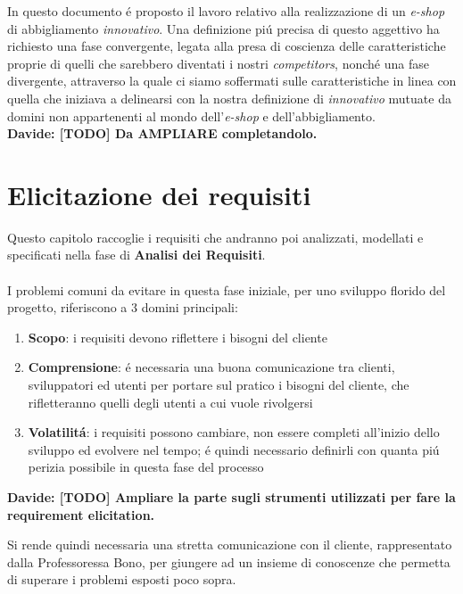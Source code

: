\documentclass[12pt]{article}
\newcommand{\davide}[1]{{\bf \color{chromeyellow} Davide: #1 }}
\begin{document}
\newpage

\tableofcontents


\newpage

\abstract{}
In questo documento \'e proposto il lavoro relativo alla realizzazione di un \textit{e-shop} di abbigliamento \textit{innovativo}. Una definizione pi\'u precisa di questo aggettivo ha richiesto una fase convergente, legata alla presa di coscienza delle caratteristiche proprie di quelli che sarebbero diventati i nostri \textit{competitors}, nonch\'e una fase divergente, attraverso la quale ci siamo soffermati sulle caratteristiche in linea con quella che iniziava a delinearsi con la nostra definizione di \textit{innovativo} mutuate da domini non appartenenti al mondo dell'\textit{e-shop} e dell'abbigliamento. 
\\
\davide{[TODO] Da AMPLIARE completandolo.}

\newpage

\section{Elicitazione dei requisiti}
Questo capitolo raccoglie i requisiti che andranno poi analizzati, modellati e specificati nella fase di \textbf{Analisi dei Requisiti}. 
\\
\\
I problemi comuni da evitare in questa fase iniziale, per uno sviluppo florido del progetto, riferiscono a 3 domini principali:
\begin{enumerate}
    \item \textbf{Scopo}: i requisiti devono riflettere i bisogni del cliente
    \item \textbf{Comprensione}: \'e necessaria una buona comunicazione tra clienti, sviluppatori ed utenti per portare sul pratico i bisogni del cliente, che rifletteranno quelli degli utenti a cui vuole rivolgersi
    \item \textbf{Volatilit\'a}: i requisiti possono cambiare, non essere completi all'inizio dello sviluppo ed evolvere nel tempo; \'e quindi necessario definirli con quanta pi\'u perizia possibile in questa fase del processo
\end{enumerate}

\davide{\textbf{[TODO]} Ampliare la parte sugli strumenti utilizzati per fare la requirement elicitation.}

Si rende quindi necessaria una stretta comunicazione con il cliente, rappresentato dalla Professoressa Bono, per giungere ad un insieme di conoscenze che permetta di superare i problemi esposti poco sopra.
\end{document}
